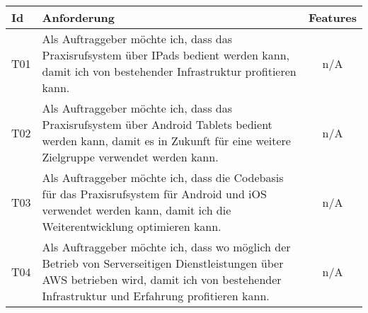 \begin{table}[h]
    \centering
    \begin{tabular}{|l|p{13cm}|c|}
        \hline
        \textbf{Id} & \textbf{Anforderung}                                                                                                                                                                          & \textbf{Features} \\
        \hline
        T01         & Als Auftraggeber möchte ich, dass das Praxisrufsystem über IPads bedient werden kann, damit ich von bestehender Infrastruktur profitieren kann. & n/A \\
        \hline
        T02         & Als Auftraggeber möchte ich, dass das Praxisrufsystem über Android Tablets bedient werden kann, damit es in Zukunft für eine weitere Zielgruppe verwendet werden kann. & n/A \\
        \hline
        T03         & Als Auftraggeber möchte ich, dass die Codebasis für das Praxisrufsystem für Android und iOS verwendet werden kann, damit ich die Weiterentwicklung optimieren kann. & n/A \\
        \hline
        T04         & Als Auftraggeber möchte ich, dass wo möglich der Betrieb von Serverseitigen Dienstleistungen über AWS betrieben wird, damit ich von bestehender Infrastruktur und Erfahrung profitieren kann. & n/A               \\
        \hline
    \end{tabular}\label{tab:userstories3}
\end{table}

\clearpage

